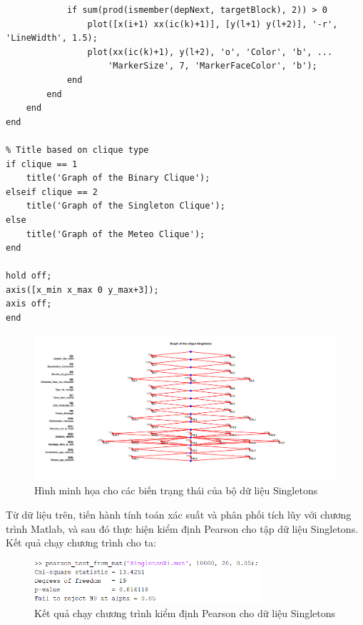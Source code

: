 \begin{matlab}
\begin{lstlisting}[caption={Hàm vẽ sơ đồ mô hình Singletons}]
            % Check matching dependencies
            if sum(prod(ismember(depNext, targetBlock), 2)) > 0
                plot([x(i+1) xx(ic(k)+1)], [y(l+1) y(l+2)], '-r', 'LineWidth', 1.5); 
                plot(xx(ic(k)+1), y(l+2), 'o', 'Color', 'b', ...
                    'MarkerSize', 7, 'MarkerFaceColor', 'b');
            end
        end
    end
end

% Title based on clique type
if clique == 1
    title('Graph of the Binary Clique');
elseif clique == 2
    title('Graph of the Singleton Clique');
else
    title('Graph of the Meteo Clique');
end

hold off;
axis([x_min x_max 0 y_max+3]);
axis off;
end
\end{lstlisting}
\end{matlab}

\begin{figure}[h!]
    \centering
    \includegraphics[width=1.2\textwidth]{../../assets/images/fig_Singletons.png}
    \caption{Hình minh họa cho các biến trạng thái của bộ dữ liệu Singletons}
    \label{fig:Singletons}
\end{figure}

Từ dữ liệu trên, tiến hành tính toán xác suất và phân phối tích lũy với chương trình Matlab, và sau đó thực hiện kiểm định Pearson cho tập dữ liệu Singletons. Kết quả chạy chương trình cho ta:

\begin{figure}[h!]
    \centering
    \includegraphics[width=0.75\textwidth]{../../assets/images/chay_singleton.png}
    \caption{Kết quả chạy chương trình kiểm định Pearson cho dữ liệu Singletons}
    \label{fig:singleton_execution}
\end{figure}

